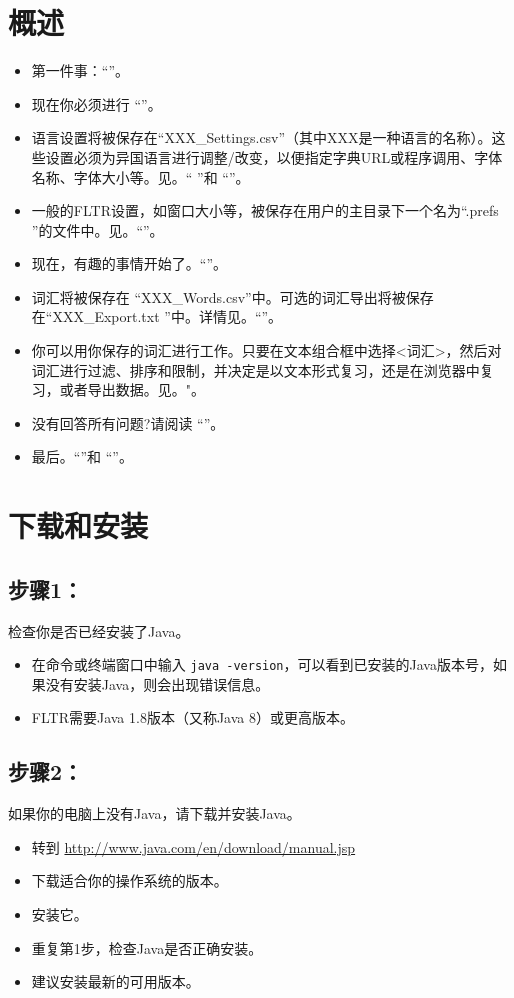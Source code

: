 \documentclass[cn,10pt,math=newtx,citestyle=gb7714-2015,bibstyle=gb7714-2015]{elegantbook}
\begin{document}
\chapter{概述}
\begin{itemize}
\item 第一件事：“”。
\item 现在你必须进行 “”。
\item 语言设置将被保存在“XXX\_Settings.csv”（其中XXX是一种语言的名称）。这些设置必须为异国语言进行调整/改变，以便指定字典URL或程序调用、字体名称、字体大小等。见。“ ”和 “”。
\item 一般的FLTR设置，如窗口大小等，被保存在用户的主目录下一个名为“.prefs ”的文件中。见。“”。
\item 现在，有趣的事情开始了。“”。
\item 词汇将被保存在 “XXX\_Words.csv”中。可选的词汇导出将被保存在“XXX\_Export.txt ”中。详情见。“”。
\item 你可以用你保存的词汇进行工作。只要在文本组合框中选择<词汇>，然后对词汇进行过滤、排序和限制，并决定是以文本形式复习，还是在浏览器中复习，或者导出数据。见。"。
\item 没有回答所有问题?请阅读 “”。
\item 最后。“”和 “”。

\end{itemize}

\chapter{下载和安装}\label{下载和安装}

\section*{步骤1：}
检查你是否已经安装了Java。
\begin{itemize}
    \item 在命令或终端窗口中输入 \lstinline{java -version}，可以看到已安装的Java版本号，如果没有安装Java，则会出现错误信息。
    \item  FLTR需要Java 1.8版本（又称Java 8）或更高版本。
\end{itemize}

\section*{步骤2：}
如果你的电脑上没有Java，请下载并安装Java。
\begin{itemize}
    \item 转到 \url{http://www.java.com/en/download/manual.jsp}
    \item 下载适合你的操作系统的版本。
    \item 安装它。
    \item 重复第1步，检查Java是否正确安装。
    \item 建议安装最新的可用版本。
\end{itemize}
\end{document}
